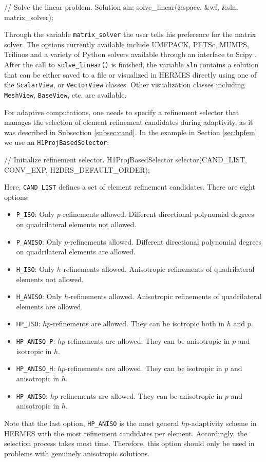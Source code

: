 \documentclass[final,3p,times,twocolumn]{elsarticle}
\begin{document}
\begin{code}
  // Solve the linear problem.
  Solution sln;
  solve_linear(&space, &wf, &sln, matrix_solver);
\end{code}
Through the variable {\tt matrix\_solver} the user tells 
his preference for the matrix solver. The options 
currently available include UMFPACK, PETSc, MUMPS, 
Trilinos and a variety of Python solvers available through 
an interface to Scipy \cite{scipy}. After the call to 
{\tt solve\_linear()} is finished, the variable {\tt sln}
contains a solution that can be either saved to a file
or visualized in HERMES directly using one of the {\tt ScalarView},
or {\tt VectorView} classes. Other visualization classes 
including {\tt MeshView}, {\tt BaseView}, etc. are available.

For adaptive computations, one needs to specify a refinement 
selector that manages the selection of element refinement 
candidates during adaptivity, as it was described in 
Subsection \ref{subsec:cand}. In the example in Section \ref{sec:hpfem}
we use an {\tt H1ProjBasedSelector}:

\begin{code}
  // Initialize refinement selector.
  H1ProjBasedSelector selector(CAND_LIST, CONV_EXP, 
                               H2DRS_DEFAULT_ORDER);
\end{code}
Here, {\tt CAND\_LIST} defines a set of element refinement candidates.
There are eight options:
\begin{itemize}
\item {\tt P\_ISO}: Only $p$-refinements allowed. Different directional 
      polynomial degrees on quadrilateral elements not allowed. 
\item {\tt P\_ANISO}: Only $p$-refinements allowed. Different directional 
      polynomial degrees on quadrilateral elements are allowed. 
\item {\tt H\_ISO}: Only $h$-refinements allowed. Anisotropic refinements
      of quadrilateral elements not allowed. 
\item {\tt H\_ANISO}: Only $h$-refinements allowed. Anisotropic refinements
      of quadrilateral elements are allowed. 
\item {\tt HP\_ISO}: $hp$-refinements are allowed. They can be isotropic 
      both in $h$ and $p$.
\item {\tt HP\_ANISO\_P}: $hp$-refinements are allowed. They can be anisotropic 
      in $p$ and isotropic in $h$.
\item {\tt HP\_ANISO\_H}: $hp$-refinements are allowed. They can be isotropic 
      in $p$ and anisotropic in $h$.
\item {\tt HP\_ANISO}: $hp$-refinements are allowed. They can be anisotropic 
      in $p$ and anisotropic in $h$. 
\end{itemize}
Note that the last option, {\tt HP\_ANISO} is the most general $hp$-adaptivity
scheme in HERMES with the most refinement candidates per element. Accordingly,
the selection process takes most time. Therefore, this option should only be 
used in problems with genuinely anisotropic solutions. 
\end{document}

